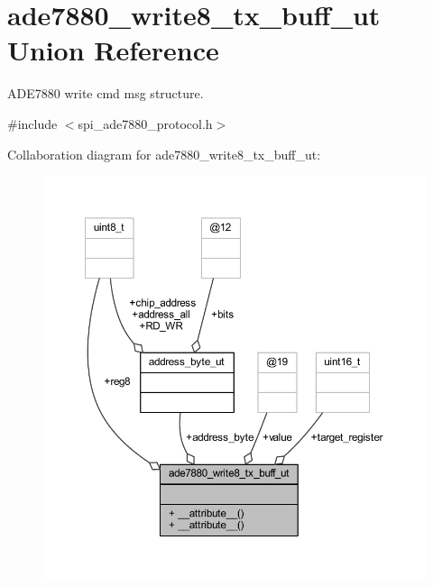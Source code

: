 \hypertarget{a00019}{\section{ade7880\-\_\-write8\-\_\-tx\-\_\-buff\-\_\-ut Union Reference}
\label{dd/da2/a00019}
}


A\-D\-E7880 write cmd msg structure.  




{\ttfamily \#include $<$spi\-\_\-ade7880\-\_\-protocol.\-h$>$}



Collaboration diagram for ade7880\-\_\-write8\-\_\-tx\-\_\-buff\-\_\-ut\-:\nopagebreak
\begin{figure}[H]
\begin{center}
\leavevmode
\includegraphics[width=350pt]{d9/da5/a00075}
\end{center}
\end{figure}
